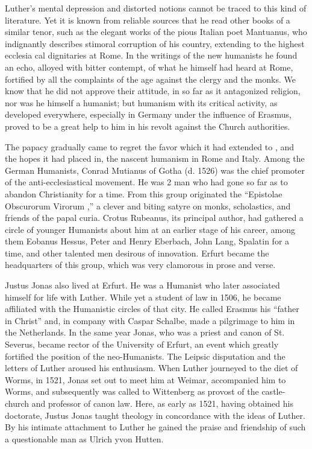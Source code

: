 Luther’s mental depression and distorted notions cannot be traced
to this kind of literature. Yet it is known from reliable sources that
he read other books of a similar tenor, such as the elegant works
of the pious Italian poet Mantuanus, who indignantly describes stimoral
corruption of his country, extending to the highest ecclesia
cal dignitaries at Rome. In the writings of the new humanists he
found an echo, alloyed with bitter contempt, of what he himself
had heard at Rome, fortified by all the complaints of the age against
the clergy and the monks. We know that he did not approve their
attitude, in so far as it antagonized religion, nor was he himself a
humanist; but humanism with its critical activity, as developed everywhere,
especially in Germany under the influence of Erasmus, proved
to be a great help to him in his revolt against the Church authorities.

The papacy gradually came to regret the favor which it had extended to
, and the hopes it had placed in, the nascent humanism
in Rome and Italy. Among the German Humanists, Conrad Mutianus
of Gotha (d. 1526) was the chief promoter of the anti-ecclesiastical
movement. He was 2 man who had gone so far as to abandon Christianity
for a time. From this group originated the “Epistolae Obscurorum Virorum
,” a clever and biting satyre on monks, scholastics, and
friends of the papal curia. Crotus Rubeanus, its principal author,
had gathered a circle of younger Humanists about him at an earlier
stage of his career, among them Eobanus Hessus, Peter and Henry
Eberbach, John Lang, Spalatin for a time, and other talented men
desirous of innovation. Erfurt became the headquarters of this
group, which was very clamorous in prose and verse.

Justus Jonas also lived at Erfurt. He was a Humanist who later
associated himself for life with Luther. While yet a student of law
in 1506, he became affiliated with the Humanistic circles of that
city. He called Erasmus his “father in Christ” and, in company
with Caspar Schalbe, made a pilgrimage to him in the Netherlands.
In the same year Jonas, who was a priest and canon of St. Severus,
became rector of the University of Erfurt, an event which greatly
fortified the position of the neo-Humanists. The Leipsic disputation and
the letters of Luther aroused his enthusiasm. When Luther
journeyed to the diet of Worms, in 1521, Jonas set out to meet him
at Weimar, accompanied him to Worms, and subsequently was
called to Wittenberg as provost of the castle-church and professor
of canon law. Here, as early as 1521, having obtained his doctorate,
Justus Jonas taught theology in concordance with the ideas of Luther.
By his intimate attachment to Luther he gained the praise and friendship
of such a questionable man as Ulrich yvon Hutten.

